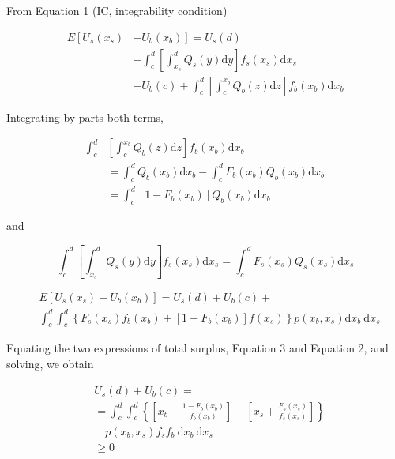 \documentclass[10pt]{article}
\begin{document}
From Equation 1 (IC, integrability condition)

$$
\begin{aligned}
E\left[U_{s}\left(x_{s}\right)\right. & \left.+U_{b}\left(x_{b}\right)\right]=U_{s}(d) \\
& +\int_{c}^{d}\left[\int_{x_{s}}^{d} Q_{s}(y) \mathrm{d} y\right] f_{s}\left(x_{s}\right) \mathrm{d} x_{s} \\
& +U_{b}(c)+\int_{c}^{d}\left[\int_{c}^{x_{b}} Q_{b}(z) \mathrm{d} z\right] f_{b}\left(x_{b}\right) \mathrm{d} x_{b}
\end{aligned}
$$

Integrating by parts both terms,

$$
\begin{aligned}
\int_{c}^{d} & {\left[\int_{c}^{x_{b}} Q_{b}(z) \mathrm{d} z\right] f_{b}\left(x_{b}\right) \mathrm{d} x_{b} } \\
& =\int_{c}^{d} Q_{b}\left(x_{b}\right) \mathrm{d} x_{b}-\int_{c}^{d} F_{b}\left(x_{b}\right) Q_{b}\left(x_{b}\right) \mathrm{d} x_{b} \\
& =\int_{c}^{d}\left[1-F_{b}\left(x_{b}\right)\right] Q_{b}\left(x_{b}\right) \mathrm{d} x_{b}
\end{aligned}
$$

and

$$
\int_{c}^{d}\left[\int_{x_{s}}^{d} Q_{s}(y) \mathrm{d} y\right] f_{s}\left(x_{s}\right) \mathrm{d} x_{s}=\int_{c}^{d} F_{s}\left(x_{s}\right) Q_{s}\left(x_{s}\right) \mathrm{d} x_{s}
$$

$$
\begin{aligned}
& E\left[U_{s}\left(x_{s}\right)+U_{b}\left(x_{b}\right)\right]=U_{s}(d)+U_{b}(c)+ \\
& \int_{c}^{d} \int_{c}^{d}\left\{F_{s}\left(x_{s}\right) f_{b}\left(x_{b}\right)+\left[1-F_{b}\left(x_{b}\right)\right] f\left(x_{s}\right)\right\} p\left(x_{b}, x_{s}\right) \mathrm{d} x_{b} \mathrm{~d} x_{s}
\end{aligned}
$$

Equating the two expressions of total surplus, Equation 3 and Equation 2, and solving, we obtain

$$
\begin{aligned}
& U_{s}(d)+U_{b}(c)= \\
& =\int_{c}^{d} \int_{c}^{d}\left\{\left[x_{b}-\frac{1-F_{b}\left(x_{b}\right)}{f_{b}\left(x_{b}\right)}\right]-\left[x_{s}+\frac{F_{s}\left(x_{s}\right)}{f_{s}\left(x_{s}\right)}\right]\right\} \\
& \quad p\left(x_{b}, x_{s}\right) f_{s} f_{b} \mathrm{~d} x_{b} \mathrm{~d} x_{s} \\
& \geq 0
\end{aligned}
$$
\end{document}
